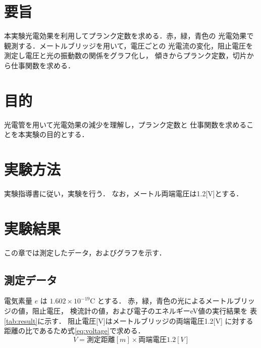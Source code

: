\documentclass[a4paper,11pt,dvipdfmx]{jsarticle}
\begin{document}
\section{要旨}
本実験光電効果を利用してプランク定数を求める．赤，緑，青色の
光電効果で観測する．メートルブリッジを用いて，電圧ごとの
光電流の変化，阻止電圧を測定し電圧と光の振動数の関係をグラフ化し，
傾きからプランク定数，切片から仕事関数を求める．

\section{目的}
光電管を用いて光電効果の減少を理解し，プランク定数と
仕事関数を求めることを本実験の目的とする．

\section{実験方法}
実験指導書\cite{key1}に従い，実験を行う．
なお，メートル両端電圧は1.2[V]とする．

\section{実験結果}
この章では測定したデータ，およびグラフを示す．
\subsection{測定データ}
電気素量 \( e \) は \( 1.602 \times 10^{-19} \mathrm{C} \) とする．
赤，緑，青色の光によるメートルブリッジの値，阻止電圧，
検流計の値，および電子のエネルギーeV値の実行結果を
表\ref{tab:result}に示す．
阻止電圧[V]はメートルブリッジの両端電圧1.2[V]
に対する距離の比であるため式\ref{eq:voltage}で求める．
\begin{equation}
V = 測定距離[m] \times 両端電圧1.2[V]
\label{eq:voltage}
\end{equation}
\end{document}

